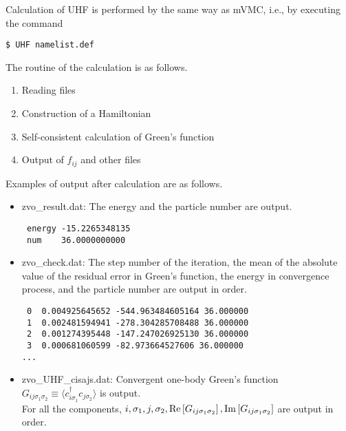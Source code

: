 Calculation of UHF is performed by the same way as mVMC, i.e., by executing the command
\begin{verbatim}
$ UHF namelist.def
\end{verbatim}
The routine of the calculation is as follows.
\begin{enumerate}
\item{Reading files}
\item{Construction of a Hamiltonian}
\item{Self-consistent calculation of Green's function}
\item{Output of $f_{ij}$ and other files}
\end{enumerate}
Examples of output after calculation are as follows.
\begin{itemize}
\item{zvo\_result.dat:}  The energy and the particle number are output. \\
\begin{minipage}{13cm}
\begin{screen}
\begin{verbatim}
 energy -15.2265348135
 num    36.0000000000
\end{verbatim}
\end{screen}
\end{minipage}
\item{zvo\_check.dat:} The step number of the iteration, the mean of the absolute value of the residual error in Green's function, the energy in convergence process, and the particle number are output in order.

\begin{minipage}{13cm}
\begin{screen}
\begin{verbatim}
 0  0.004925645652 -544.963484605164 36.000000
 1  0.002481594941 -278.304285708488 36.000000
 2  0.001274395448 -147.247026925130 36.000000
 3  0.000681060599 -82.973664527606 36.000000
...
\end{verbatim}
\end{screen}
\end{minipage}

\item{zvo\_UHF\_cisajs.dat:} Convergent one-body Green's function $G_{ij\sigma_1\sigma_2}\equiv\langle c_{i\sigma_1}^{\dag}c_{j\sigma_2}\rangle$ is output. \\
For all the components, $i, \sigma_1, j, \sigma_2, {\rm Re}\left[G_{ij\sigma_1\sigma_2}\right], {\rm Im}\left[G_{ij\sigma_1\sigma_2}\right]$ are output in order.


\end{itemize}
